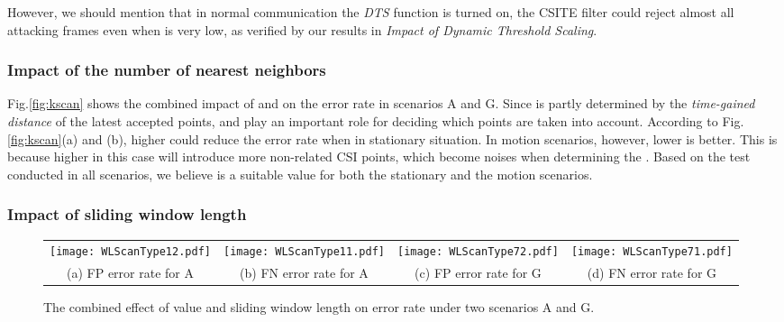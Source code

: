 \documentclass[conference]{IEEEtran}
\begin{document}
 However, we should mention that in normal communication the \textit{DTS} function is turned on, the CSITE filter could reject almost all attacking frames even when  is very low, as verified by our results in \textit{Impact of Dynamic Threshold Scaling}.



\subsubsection{Impact of the number of nearest neighbors }

Fig.\ref{fig:kscan} shows the combined impact of  and  on the error rate in scenarios A and G. Since  is partly determined by the \textit{time-gained distance} of the latest accepted points,  and  play an important role for deciding which points are taken into account.
According to Fig.\ref{fig:kscan}(a) and (b), higher  could reduce the error rate when in stationary situation. In motion scenarios, however, lower  is better. This is because higher  in this case will introduce more non-related CSI points, which become noises when determining the . Based on the test conducted in all scenarios, we believe  is a suitable value for both the stationary and the motion scenarios.

\subsubsection{Impact of sliding window length }

\begin{figure*}[!ht]
\begin{center}
\begin{tabular}{cccc}
\hspace{-0.25in}\texttt{[image: WLScanType12.pdf]} \hspace{-0.3in} &
\texttt{[image: WLScanType11.pdf]} \hspace{-0.3in} &
\texttt{[image: WLScanType72.pdf]} \hspace{-0.3in} &
\texttt{[image: WLScanType71.pdf]}  \\
(a) FP error rate for A&(b) FN error rate for A &(c) FP error rate for G&(d) FN error rate for G
\end{tabular}
\end{center}
\caption{The combined effect of value  and sliding window length  on error rate under two scenarios A and G.}
\vspace{-0.1in}
\label{fig:WLScan}
\end{figure*}
\end{document}
